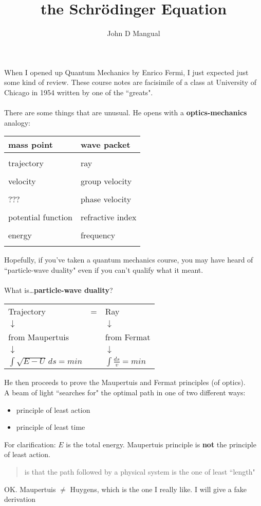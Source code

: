 \documentclass[12pt]{article}
\title{the Schr\"{o}dinger Equation}
\author{John D Mangual}
\date{}
\begin{document}
\selectfont \fontsize{12.5}{15}\selectfont

\maketitle

\noindent When I opened up Quantum Mechanics by Enrico Fermi, I just expected just some kind of review.  These course notes are facisimile of a class at University of Chicago in 1954 written by one of the ``greats". \\ \\
There are some things that are unusual.  He opens with a \textbf{optics-mechanics} analogy:
\begin{center}
\begin{tabular}{l|l} 
mass point & wave packet \\ \hline  \\ 
trajectory & ray \\  \hline \\
velocity & group velocity \\ \hline  \\
??? & phase velocity \\  \hline \\
potential function & refractive index \\ \hline  \\
energy & frequency \\  \hline \\
\end{tabular}
\end{center}
Hopefully, if you've taken a quantum mechanics course, you may have heard of ``particle-wave duality" even if you can't qualify what it meant.  \\ \\
What is\dots \textbf{particle-wave duality}? 
\begin{center}
\begin{tabular}{lcl}
Trajectory &=& Ray \\ 
$\downarrow$ & & $\downarrow$ \\
from Maupertuis & & from Fermat \\ 
$\downarrow$ & & $\downarrow$ \\
$\int \sqrt{E - U}\, ds = min $ & & $\int \frac{ds}{v} = min$
\end{tabular}
\end{center}
He then proceeds to prove the Maupertuis and Fermat principles (of optics). \\
A beam of light ``searches for" the optimal path in one of two different ways:
\begin{itemize}
\item principle of least action
\item principle of least time
\end{itemize}
For clarification: $E$ is the total energy.  Maupertuis principle is \textbf{not} the principle of least action.
\begin{quotation}
is that the path followed by a physical system is the one of least ``length"
\end{quotation}
OK.  Maupertuis $ \neq $ Huygens, which is the one I really like. I will give a fake derivation
\end{document}
